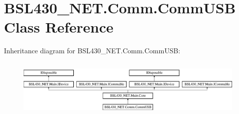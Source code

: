 \hypertarget{class_b_s_l430___n_e_t_1_1_comm_1_1_comm_u_s_b}{}\section{B\+S\+L430\+\_\+\+N\+E\+T.\+Comm.\+Comm\+U\+SB Class Reference}
\label{class_b_s_l430___n_e_t_1_1_comm_1_1_comm_u_s_b}
Inheritance diagram for B\+S\+L430\+\_\+\+N\+E\+T.\+Comm.\+Comm\+U\+SB\+:\begin{figure}[H]
\begin{center}
\leavevmode
\includegraphics[height=2.871795cm]{class_b_s_l430___n_e_t_1_1_comm_1_1_comm_u_s_b}
\end{center}
\end{figure}
